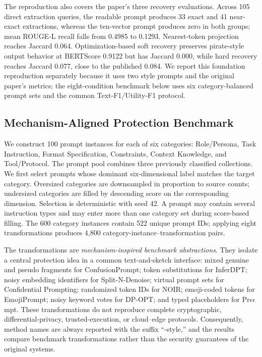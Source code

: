 \documentclass[letterpaper]{article} %
\begin{document}
The reproduction also covers the paper's three recovery evaluations.  Across 105 direct extraction queries, the readable prompt produces 33 exact and 41 near-exact extractions, whereas the ten-vector prompt produces zero in both groups; mean ROUGE-L recall falls from 0.4985 to 0.1293.  Nearest-token projection reaches Jaccard 0.064.  Optimization-based soft recovery preserves pirate-style output behavior at BERTScore 0.9122 but has Jaccard 0.000, while hard recovery reaches Jaccard 0.077, close to the published 0.084.  We report this foundation reproduction separately because it uses two style prompts and the original paper's metrics; the eight-condition benchmark below uses six category-balanced prompt sets and the common Text-F1/Utility-F1 protocol.

\subsection{Mechanism-Aligned Protection Benchmark}

We construct 100 prompt instances for each of six categories: Role/Persona, Task Instruction, Format Specification, Constraints, Context Knowledge, and Tool/Protocol.  The prompt pool combines three previously classified collections.  We first select prompts whose dominant six-dimensional label matches the target category.  Oversized categories are downsampled in proportion to source counts; undersized categories are filled by descending score on the corresponding dimension.  Selection is deterministic with seed 42.  A prompt may contain several instruction types and may enter more than one category set during score-based filling.  The 600 category instances contain 522 unique prompt IDs; applying eight transformations produces 4,800 category-instance--transformation pairs.

The transformations are \emph{mechanism-inspired benchmark abstractions}.  They isolate a central protection idea in a common text-and-sketch interface: mixed genuine and pseudo fragments for ConfusionPrompt; token substitutions for InferDPT; noisy embedding identifiers for Split-N-Denoise; virtual prompt sets for Confidential Prompting; randomized token IDs for NOIR; emoji-coded tokens for EmojiPrompt; noisy keyword votes for DP-OPT; and typed placeholders for Pr$\epsilon\epsilon$mpt.  These transformations do not reproduce complete cryptographic, differential-privacy, trusted-execution, or cloud--edge protocols.  Consequently, method names are always reported with the suffix ``-style,'' and the results compare benchmark transformations rather than the security guarantees of the original systems.
\end{document}
